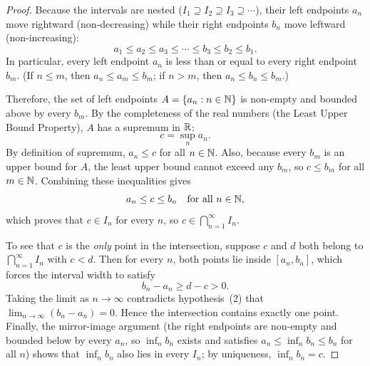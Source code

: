 \begin{proof}
Because the intervals are nested ($I_1 \supseteq I_2 \supseteq I_3 \supseteq \cdots$), their left endpoints $a_n$ move rightward (non-decreasing) while their right endpoints $b_n$ move leftward (non-increasing):
\[
a_1 \le a_2 \le a_3 \le \cdots \le b_3 \le b_2 \le b_1.
\]
In particular, every left endpoint $a_n$ is less than or equal to every right endpoint $b_m$. (If $n \le m$, then $a_n \le a_m \le b_m$; if $n > m$, then $a_n \le b_n \le b_m$.)

Therefore, the set of left endpoints $A = \{a_n : n \in \mathbb{N}\}$ is non-empty and bounded above by every $b_m$. By the completeness of the real numbers (the Least Upper Bound Property), $A$ has a supremum in $\mathbb{R}$:
\[
c = \sup_{n} a_n.
\]
By definition of supremum, $a_n \le c$ for all $n \in \mathbb{N}$. Also, because every $b_m$ is an upper bound for $A$, the least upper bound cannot exceed any $b_m$, so $c \le b_m$ for all $m \in \mathbb{N}$. Combining these inequalities gives
\[
a_n \le c \le b_n \quad \text{for all } n \in \mathbb{N},
\]
which proves that $c \in I_n$ for every $n$, so $c \in \bigcap_{n=1}^\infty I_n$.

To see that $c$ is the \emph{only} point in the intersection, suppose $c$ and $d$ both belong to $\bigcap_{n=1}^\infty I_n$ with $c < d$. Then for every $n$, both points lie inside $[a_n, b_n]$, which forces the interval width to satisfy
\[
b_n - a_n \ge d - c > 0.
\]
Taking the limit as $n \to \infty$ contradicts hypothesis~(2) that $\lim_{n \to \infty} (b_n - a_n) = 0$. Hence the intersection contains exactly one point. Finally, the mirror-image argument (the right endpoints are non-empty and bounded below by every $a_n$, so $\inf_n b_n$ exists and satisfies $a_n \le \inf_n b_n \le b_n$ for all $n$) shows that $\inf_n b_n$ also lies in every $I_n$; by uniqueness, $\inf_n b_n = c$.
\end{proof}

